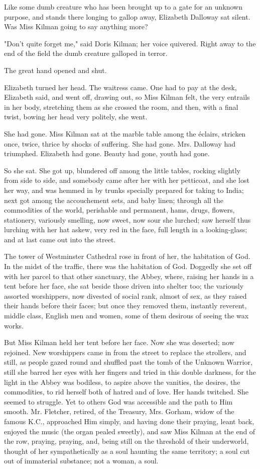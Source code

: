 \documentclass[lang=cn,10pt]{elegantbook}
\begin{document}
Like some dumb creature who has been brought up to a gate for an
unknown purpose, and stands there longing to gallop away, Elizabeth
Dalloway sat silent.  Was Miss Kilman going to say anything more?

"Don't quite forget me," said Doris Kilman; her voice quivered.
Right away to the end of the field the dumb creature galloped in
terror.

The great hand opened and shut.

Elizabeth turned her head.  The waitress came.  One had to pay at
the desk, Elizabeth said, and went off, drawing out, so Miss Kilman
felt, the very entrails in her body, stretching them as she crossed
the room, and then, with a final twist, bowing her head very
politely, she went.

She had gone.  Miss Kilman sat at the marble table among the
éclairs, stricken once, twice, thrice by shocks of suffering.  She
had gone.  Mrs. Dalloway had triumphed.  Elizabeth had gone.
Beauty had gone, youth had gone.

So she sat.  She got up, blundered off among the little tables,
rocking slightly from side to side, and somebody came after her
with her petticoat, and she lost her way, and was hemmed in by
trunks specially prepared for taking to India; next got among the
accouchement sets, and baby linen; through all the commodities of
the world, perishable and permanent, hams, drugs, flowers,
stationery, variously smelling, now sweet, now sour she lurched;
saw herself thus lurching with her hat askew, very red in the face,
full length in a looking-glass; and at last came out into the
street.

The tower of Westminster Cathedral rose in front of her, the
habitation of God.  In the midst of the traffic, there was the
habitation of God.  Doggedly she set off with her parcel to that
other sanctuary, the Abbey, where, raising her hands in a tent
before her face, she sat beside those driven into shelter too; the
variously assorted worshippers, now divested of social rank, almost
of sex, as they raised their hands before their faces; but once
they removed them, instantly reverent, middle class, English men
and women, some of them desirous of seeing the wax works.

But Miss Kilman held her tent before her face.  Now she was
deserted; now rejoined.  New worshippers came in from the street to
replace the strollers, and still, as people gazed round and
shuffled past the tomb of the Unknown Warrior, still she barred her
eyes with her fingers and tried in this double darkness, for the
light in the Abbey was bodiless, to aspire above the vanities, the
desires, the commodities, to rid herself both of hatred and of
love.  Her hands twitched.  She seemed to struggle.  Yet to others
God was accessible and the path to Him smooth.  Mr. Fletcher,
retired, of the Treasury, Mrs. Gorham, widow of the famous K.C.,
approached Him simply, and having done their praying, leant back,
enjoyed the music (the organ pealed sweetly), and saw Miss Kilman
at the end of the row, praying, praying, and, being still on the
threshold of their underworld, thought of her sympathetically as a
soul haunting the same territory; a soul cut out of immaterial
substance; not a woman, a soul.
\end{document}
